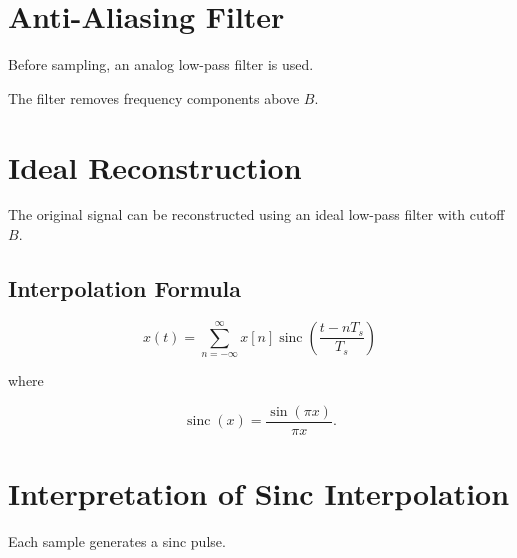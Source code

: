 \section{Anti-Aliasing Filter}

Before sampling, an analog low-pass filter is used.

\begin{center}
\end{center}

The filter removes frequency components above \(B\).


\section{Ideal Reconstruction}

The original signal can be reconstructed using an ideal low-pass filter with
cutoff \(B\).


\subsection{Interpolation Formula}

\[
\boxed{
x(t)=
\sum_{n=-\infty}^{\infty}
x[n]
\operatorname{sinc}
\left(
\frac{t-nT_s}{T_s}
\right)
}
\]

where

\[
\operatorname{sinc}(x)=
\frac{\sin(\pi x)}{\pi x}.
\]


\section{Interpretation of Sinc Interpolation}

Each sample generates a sinc pulse.

